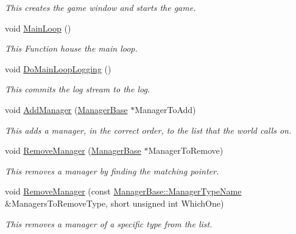 \begin{DoxyCompactItemize}
\begin{DoxyCompactList}\small\item\em This creates the game window and starts the game. \item\end{DoxyCompactList}\item 
void \hyperlink{classphys_1_1World_af1d9e36d43f5e50543fa2351a32c8362}{MainLoop} ()
\begin{DoxyCompactList}\small\item\em This Function house the main loop. \item\end{DoxyCompactList}\item 
void \hyperlink{classphys_1_1World_a1461e6c9d16214aa2cc310035b149378}{DoMainLoopLogging} ()
\begin{DoxyCompactList}\small\item\em This commits the log stream to the log. \item\end{DoxyCompactList}\item 
void \hyperlink{classphys_1_1World_aa709932e21d9d19a91ee38cd7a575556}{AddManager} (\hyperlink{classphys_1_1ManagerBase}{ManagerBase} $\ast$ManagerToAdd)
\begin{DoxyCompactList}\small\item\em This adds a manager, in the correct order, to the list that the world calls on. \item\end{DoxyCompactList}\item 
void \hyperlink{classphys_1_1World_ae3be85997185935421bf5230651d8e37}{RemoveManager} (\hyperlink{classphys_1_1ManagerBase}{ManagerBase} $\ast$ManagerToRemove)
\begin{DoxyCompactList}\small\item\em This removes a manager by finding the matching pointer. \item\end{DoxyCompactList}\item 
void \hyperlink{classphys_1_1World_ad885d1102ecdd13cc277ee3f7dfcb742}{RemoveManager} (const \hyperlink{classphys_1_1ManagerBase_aaa6ccddf23892eaccb898529414f80a5}{ManagerBase::ManagerTypeName} \&ManagersToRemoveType, short unsigned int WhichOne)
\begin{DoxyCompactList}\small\item\em This removes a manager of a specific type from the list. \item\end{DoxyCompactList}\item 

\end{DoxyCompactItemize}
